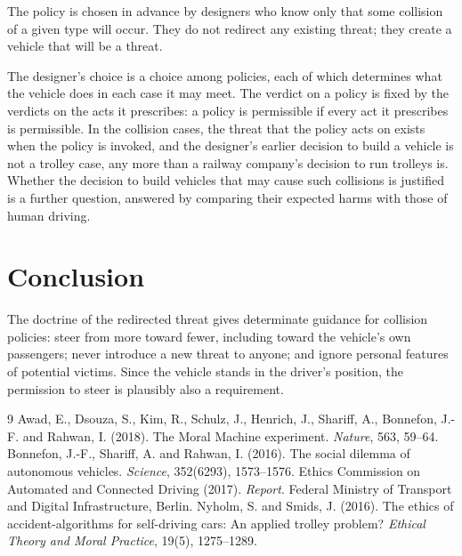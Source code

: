 \documentclass{situationist-preprint}
\begin{document}
\begin{objection}[Designers]
The policy is chosen in advance by designers who know only that some collision of a given type will occur. They do not redirect any existing threat; they create a vehicle that will be a threat.
\end{objection}

\begin{reply}
The designer's choice is a choice among policies, each of which determines what the vehicle does in each case it may meet. The verdict on a policy is fixed by the verdicts on the acts it prescribes: a policy is permissible if every act it prescribes is permissible. In the collision cases, the threat that the policy acts on exists when the policy is invoked, and the designer's earlier decision to build a vehicle is not a trolley case, any more than a railway company's decision to run trolleys is. Whether the decision to build vehicles that may cause such collisions is justified is a further question, answered by comparing their expected harms with those of human driving.
\end{reply}

\section{Conclusion}

The doctrine of the redirected threat gives determinate guidance for collision policies: steer from more toward fewer, including toward the vehicle's own passengers; never introduce a new threat to anyone; and ignore personal features of potential victims. Since the vehicle stands in the driver's position, the permission to steer is plausibly also a requirement.

\begin{thebibliography}{9}\small
{} Awad, E., Dsouza, S., Kim, R., Schulz, J., Henrich, J., Shariff, A., Bonnefon, J.-F. and Rahwan, I. (2018). The Moral Machine experiment. \emph{Nature}, 563, 59--64.
 Bonnefon, J.-F., Shariff, A. and Rahwan, I. (2016). The social dilemma of autonomous vehicles. \emph{Science}, 352(6293), 1573--1576.
 Ethics Commission on Automated and Connected Driving (2017). \emph{Report}. Federal Ministry of Transport and Digital Infrastructure, Berlin.
 Nyholm, S. and Smids, J. (2016). The ethics of accident-algorithms for self-driving cars: An applied trolley problem? \emph{Ethical Theory and Moral Practice}, 19(5), 1275--1289.
\end{thebibliography}
\end{document}
